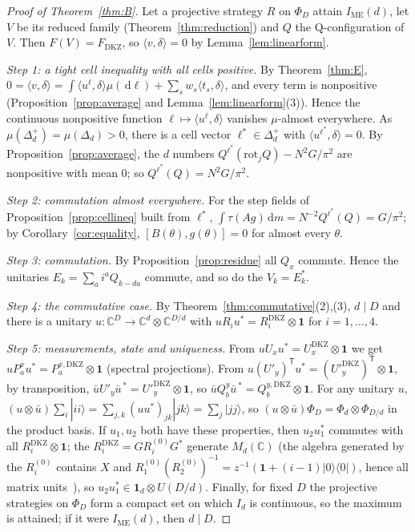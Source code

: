\documentclass[11pt]{amsart}
\theoremstyle{definition}
\theoremstyle{remark}
\numberwithin{equation}{section}
\newcommand{\C}{\mathbb{C}}
\newcommand{\FD}{F_{\mathrm{DKZ}}}
\newcommand{\IME}{I_{\mathrm{ME}}}
\newcommand{\one}{\mathbf{1}}
\newcommand{\ip}[2]{\langle #1,#2\rangle}
\newcommand{\dd}{\,\mathrm{d}}
\begin{document}
\begin{proof}[Proof of Theorem~\ref{thm:B}]
Let a projective strategy $R$ on $\Phi_D$ attain $\IME(d)$, let $V$ be its reduced family (Theorem~\ref{thm:reduction}) and
$Q$ the Q-configuration of $V$. Then $F(V)=\FD$, so $\ip v\delta=0$ by Lemma~\ref{lem:linearform}.

\emph{Step 1: a tight cell inequality with all cells positive.} By Theorem~\ref{thm:E},
$0=\ip v\delta=\int\ip{u^\ell}\delta\mu(\dd\ell)+\sum_sw_s\ip{t_s}\delta$, and every term is nonpositive
(Proposition~\ref{prop:average} and Lemma~\ref{lem:linearform}(3)). Hence the continuous nonpositive function
$\ell\mapsto\ip{u^\ell}\delta$ vanishes $\mu$-almost everywhere. As $\mu(\Delta_d^+)=\mu(\Delta_d)>0$, there is a cell vector
$\ell^*\in\Delta_d^+$ with $\ip{u^{\ell^*}}\delta=0$. By Proposition~\ref{prop:average}, the $d$ numbers
$Q^{\ell^*}(\mathrm{rot}_jQ)-N^2G/\pi^2$ are nonpositive with mean $0$; so $Q^{\ell^*}(Q)=N^2G/\pi^2$.

\emph{Step 2: commutation almost everywhere.} For the step fields of Proposition~\ref{prop:cellineq} built from $\ell^*$,
$\int\tau(Ag)\dd m=N^{-2}Q^{\ell^*}(Q)=G/\pi^2$; by Corollary~\ref{cor:equality}, $[B(\theta),g(\theta)]=0$ for almost every
$\theta$.

\emph{Step 3: commutation.} By Proposition~\ref{prop:residue} all $Q_x$ commute. Hence the unitaries
$E_k=\sum_ai^aQ_{k-da}$ commute, and so do the $V_k=E_k^*$.

\emph{Step 4: the commutative case.} By Theorem~\ref{thm:commutative}(2),(3), $d\mid D$ and there is a unitary
$u\colon\C^D\to\C^d\otimes\C^{D/d}$ with $uR_iu^*=R_i^{\mathrm{DKZ}}\otimes\one$ for $i=1,\dots,4$.

\emph{Step 5: measurements, state and uniqueness.} From $uU_xu^*=U_x^{\mathrm{DKZ}}\otimes\one$ we get
$uP^x_au^*=P^{x,\mathrm{DKZ}}_a\otimes\one$ (spectral projections). From $u(U'_y)^{\mathsf T}u^*=(U'^{\mathrm{DKZ}}_y)^{\mathsf T}\otimes\one$, by
transposition, $\bar uU'_y\bar u^{\,*}=U'^{\mathrm{DKZ}}_y\otimes\one$, so $\bar uQ^y_b\bar u^{\,*}=Q^{y,\mathrm{DKZ}}_b\otimes\one$. For any
unitary $u$, $(u\otimes\bar u)\sum_i|ii\rangle=\sum_{j,k}(uu^*)_{jk}|jk\rangle=\sum_j|jj\rangle$, so $(u\otimes\bar u)\Phi_D=\Phi_d\otimes\Phi_{D/d}$
in the product basis. If $u_1,u_2$ both have these properties, then $u_2u_1^*$ commutes with all $R^{\mathrm{DKZ}}_i\otimes\one$;
the $R_i^{\mathrm{DKZ}}=GR_i^{(0)}G^*$ generate $M_d(\C)$ (the algebra generated by the $R^{(0)}_i$ contains $X$ and
$R^{(0)}_1(R^{(0)}_2)^{-1}=z^{-1}(\one+(i-1)|0\rangle\langle0|)$, hence all matrix units~\cite[proof of
Corollary~C]{MS-classical}), so $u_2u_1^*\in\one_d\otimes U(D/d)$. Finally, for fixed $D$ the projective strategies on $\Phi_D$ form a
compact set on which $I_d$ is continuous, so the maximum is attained; if it were $\IME(d)$, then $d\mid D$.
\end{proof}
\end{document}

